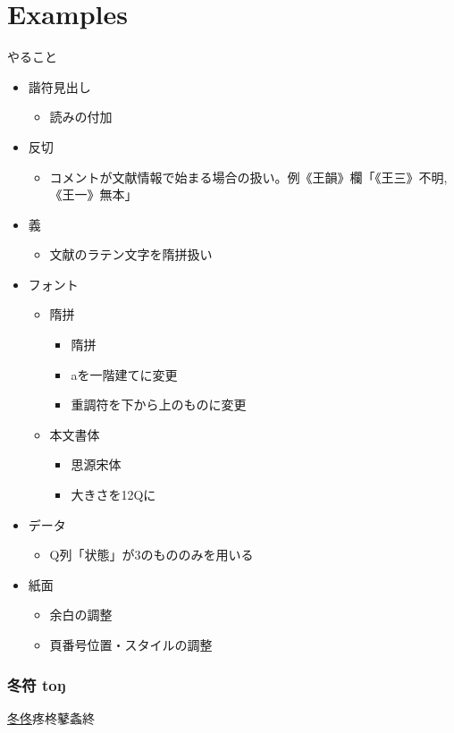 \documentclass[a5paper]{article}
\newcommand{\PartHeader}[2]{%
  \section{#1}%
  \begin{center}
    \centering #2
  \end{center}
  \vspace{0.5em plus 0.2em minus 0.05em}
}
\newcommand{\refEntry}[1]{\hyperref[entry-#1]{#1}}
\begin{document}
\part{Examples}
やること
\begin{itemize}
\item{} 諧符見出し
  \begin{itemize}
  \item{} 読みの付加
  \end{itemize}
\item{} 反切
  \begin{itemize}
  \item{} コメントが文献情報で始まる場合の扱い。例《王韻》欄「《王三》不明,《王一》無本」
  \end{itemize}
\item{} 義
  \begin{itemize}
  \item{} 文献のラテン文字を隋拼扱い
  \end{itemize}
\item{} フォント
  \begin{itemize}
  \item{} 隋拼
    \begin{itemize}
    \item{} 隋拼
    \item{} aを一階建てに変更
    \item{} 重調符を下から上のものに変更
    \end{itemize}
  \item{} 本文書体
    \begin{itemize}
    \item{} 思源宋体
    \item{} 大きさを12Qに
    \end{itemize}
  \end{itemize}
\item{} データ
  \begin{itemize}
  \item{} Q列「状態」が3のもののみを用いる
  \end{itemize}
\item{} 紙面
  \begin{itemize}
  \item{} 余白の調整
  \item{} 頁番号位置・スタイルの調整
  \end{itemize}
\end{itemize}

\PartHeader{冬符 toŋ}{\refEntry{冬}\refEntry{佟}{疼}{柊}{鼕}{螽}{終}}
\end{document}
